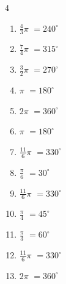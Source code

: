 \begin{multicols}{4}
\begin{enumerate}
  \item $\displaystyle \frac{4}{3}\pi$
        $\displaystyle =240^{\circ}$

  \item $\displaystyle \frac{7}{4}\pi$
        $\displaystyle =315^{\circ}$

  \item $\displaystyle \frac{3}{2}\pi$
        $\displaystyle =270^{\circ}$

  \item $\displaystyle \pi$
        $\displaystyle =180^{\circ}$

  \item $\displaystyle 2\pi$
        $\displaystyle =360^{\circ}$

  \item $\displaystyle \pi$
        $\displaystyle =180^{\circ}$

  \item $\displaystyle \frac{11}{6}\pi$
        $\displaystyle =330^{\circ}$

  \item $\displaystyle \frac{\pi}{6}$
        $\displaystyle =30^{\circ}$

  \item $\displaystyle \frac{11}{6}\pi$
        $\displaystyle =330^{\circ}$

  \item $\displaystyle \frac{\pi}{4}$
        $\displaystyle =45^{\circ}$

  \item $\displaystyle \frac{\pi}{3}$
        $\displaystyle =60^{\circ}$

  \item $\displaystyle \frac{11}{6}\pi$
        $\displaystyle =330^{\circ}$

  \item $\displaystyle 2\pi$
        $\displaystyle =360^{\circ}$

\end{enumerate}
\end{multicols}
